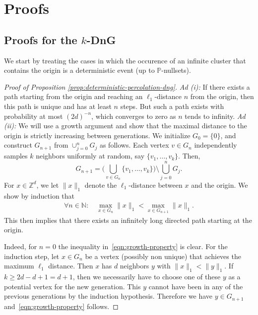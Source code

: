 \documentclass[a4paper, oneside, 11pt]{amsart}
\newcommand{\N}{\mathbb{N}}
\theoremstyle{definition}
\renewcommand{\P}{\mathbb{P}}
\newcommand{\1}{\mathbbm{1}}
\newcommand{\0}{\mathbf{o}}
\newcommand{\Z}{\mathbb{Z}}
\newcommand*{\be}{\begin{equation}}
\newcommand*{\ee}{\end{equation}}
\numberwithin{equation}{section}
\begin{document}
\section{Proofs}\label{sec:proof}
\subsection{Proofs for the $k$-DnG}\label{sec:proofs-dng}
We start by treating the cases in which the occurence of an infinite cluster that contains the origin is a deterministic event (up to $\P$-nullsets). 
\begin{proof}[Proof of Proposition \ref{prop:deterministic-percolation-dng}]
    \textit{Ad (i):} 
    If there exists a path starting from the origin and reaching an $\ell_1$-distance $n$ from the origin, then this path is unique and has at least $n$ steps. But such a path exists with probability at most $(2d)^{-n}$, which converges to zero as $n$ tends to infinity.
    \medskip
    \newline 
    \textit{Ad (ii):} 
    We will use a growth argument and show that the maximal distance to the origin is strictly increasing between generations. We initialize $G_0=\{0\}$, and construct $G_{n+1}$ from $\cup_{j=0}^nG_j$ as follows. Each vertex $v\in G_n$ independently samples $k$ neighbors uniformly at random, say $\{v_1,\ldots, v_k\}$. Then, 
    \be 
    G_{n+1}=\Big(\bigcup_{v\in G_n}\{v_1,\ldots, v_k\}\Big)\setminus \bigcup_{j=0}^n G_j. 
    \ee
    For $x\in\Z^d$, we let $\|x\|_1$ denote the $\ell_1$-distance between $x$ and the origin. We show by induction that 
    \begin{align}\label{eqn:growth-property}
         \forall n  \in \N:   \quad \max_{x \in G_n}\|x\|_1 < \max_{x \in G_{n+1}}\|x\|_1.  
    \end{align}
    This then implies that there exists an infinitely long directed path starting at the origin. 
    
    Indeed, for $n=0$ the inequality in~\eqref{eqn:growth-property} is clear. For the induction step, let $x \in G_n$ be a vertex (possibly non unique) that achieves the maximum $\ell_1$ distance. Then $x$ has $d$ neighbors $y$ with $\|x\|_1 < \|y\|_1$. If $k  \geq 2d-d+1=d+1$, then we necessarily have to choose one of these $y$ as a potential vertex for the new generation. This $y$ cannot have been in any of the previous generations by the induction hypothesis. Therefore we have $y \in G_{n+1}$ and~\eqref{eqn:growth-property} follows. 
\end{proof}
\end{document}
